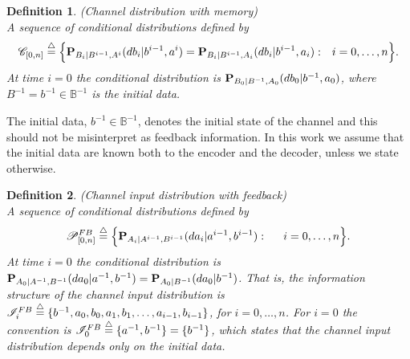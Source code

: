 \documentclass[11pt, a4paper, journal,onecolumn]{IEEEtran}
\newcommand{\mb}{\mathbb}
\newcommand{\sr}{\stackrel}
\newcommand{\tri}{\sr{\triangle}{=}}
\newcommand{\bea}{\begin{eqnarray}}
\newcommand{\eea}{\end{eqnarray}}
\newcommand{\hso}{\hspace{.1in}}
\newtheorem{definition}{Definition}[section]
\begin{document}
\begin{definition}(Channel distribution with memory)\label{def:umco_channel}\\
A sequence of conditional distributions  defined by
\begin{align}
{\cal C}_{[0,n]} \tri \Big\{{\bf P}_{B_i|B^{i-1},A^{i}}(d{b}_i|b^{i-1},a^{i})={\bf P}_{B_i|B^{i-1},A_{i}}(d{b}_i|b^{i-1},a_{i}) : \hso i=0, \ldots, n \Big\}. \label{ch_1}
\end{align}
At time $i=0$ the conditional distribution is ${\bf P}_{B_0|B^{-1},A_{0}}(d{b}_0|b^{-1},a_{0})$, where $B^{-1}=b^{-1} \in {\mb B}^{-1}$ is the initial data.
\end{definition}
The initial data, $b^{-1} \in {\mb B}^{-1}$, denotes the initial state of the channel and this should not be misinterpret as feedback information. In this work we assume that the initial data are known both to the encoder and the decoder, unless we state otherwise.\\

\begin{definition}(Channel input distribution with feedback)\\
A sequence of conditional 
distributions  defined by
\bea
{\cal P}_{[0,n]}^{FB} \tri \Big\{{\bf P}_{A_i|A^{i-1},B^{i-1}}({da}_i|a^{i-1},b^{i-1}): \hso  \hso i=0, \ldots, n\Big\}.
\eea
At time $i=0$ the conditional distribution is ${\bf P}_{A_0|A^{-1},B^{-1}}({da}_0|a^{-1},b^{-1})={\bf P}_{A_0|B^{-1}}({da}_0|b^{-1})$. That is, the information structure of the channel input distribution is  ${\cal I}_i^{FB} \tri \{ b^{-1},a_0, b_0, a_1, b_1, \ldots, a_{i-1}, b_{i-1}\}$,  for $i=0, \ldots, n$. For $i=0$ the convention is  ${\cal I}_0^{FB}\tri \{a^{-1}, b^{-1}\}=\{b^{-1}\}$, which states that the channel input distribution depends only on the initial data.\\
\end{definition}
\end{document}
